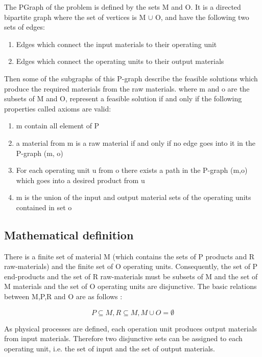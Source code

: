 The PGraph  of the problem is defined by the sets M and O. It is a directed bipartite graph where the set of vertices is M $\cup$ O, and have the following two sets of edges:
\begin{enumerate}
\item Edges which connect the input materials to their operating unit
\item Edges which connect the operating units to their output materials
\end{enumerate}

Then some of the subgraphs of this P-graph describe the feasible solutions which produce the required materials from the raw materials.  
where m and o are the subsets of M and O, represent a feasible solution if and only if the following properties called axioms are valid: 
\begin{enumerate}

\item m contain all element of P    
\item a material from m is a raw material if and only if no edge goes into it in the P-graph (m, o)  
\item For each operating unit u from o there exists a path in the P-graph (m,o) which goes into a desired product from u  
\item m is the union of the input and output material sets of the operating units contained 
in set o  
 
\end{enumerate}

\subsection{Mathematical definition }

There is a finite set of material M (which contains the sets of P products and R raw-materials) 
and the finite set of O operating units. 
Consequently, the set of P end-products and the set of R raw-materials must be subsets of M 
and the set of M materials and the set of O operating units are disjunctive.
The basic relations between M,P,R and O are as follows : 

\begin{equation}
P\subseteq M,R\subseteq M,M\cup O=\emptyset\label{eq:1}
\end{equation}

As physical processes are defined, each operation unit produces output materials from
input materials. Therefore two disjunctive sets can be assigned to each operating unit, i.e. the set of input and the set of output materials. 

